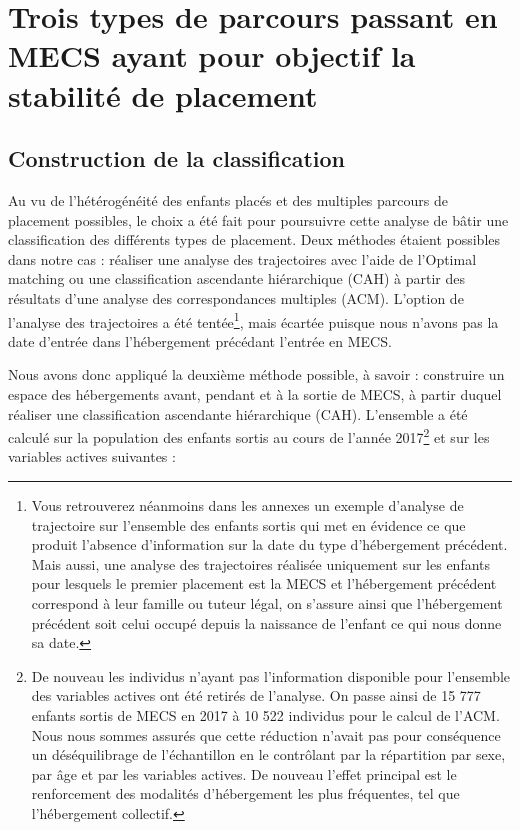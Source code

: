 \documentclass[
  12,
  a4paper,
]{report}
\begin{document}
\hypertarget{trois-types-de-parcours-passant-en-mecs-ayant-pour-objectif-la-stabilituxe9-de-placement}{%
\section{Trois types de parcours passant en MECS ayant pour objectif la
stabilité de
placement}\label{trois-types-de-parcours-passant-en-mecs-ayant-pour-objectif-la-stabilituxe9-de-placement}}

\hypertarget{construction-de-la-classification}{%
\subsection{Construction de la
classification}\label{construction-de-la-classification}}

Au vu de l'hétérogénéité des enfants placés et des multiples parcours de
placement possibles, le choix a été fait pour poursuivre cette analyse
de bâtir une classification des différents types de placement. Deux
méthodes étaient possibles dans notre cas : réaliser une analyse des
trajectoires avec l'aide de l'Optimal matching ou une classification
ascendante hiérarchique (CAH) à partir des résultats d'une analyse des
correspondances multiples (ACM). L'option de l'analyse des trajectoires
a été tentée\footnote{Vous retrouverez néanmoins dans les annexes un
  exemple d'analyse de trajectoire sur l'ensemble des enfants sortis qui
  met en évidence ce que produit l'absence d'information sur la date du
  type d'hébergement précédent. Mais aussi, une analyse des trajectoires
  réalisée uniquement sur les enfants pour lesquels le premier placement
  est la MECS et l'hébergement précédent correspond à leur famille ou
  tuteur légal, on s'assure ainsi que l'hébergement précédent soit celui
  occupé depuis la naissance de l'enfant ce qui nous donne sa date.},
mais écartée puisque nous n'avons pas la date d'entrée dans
l'hébergement précédant l'entrée en MECS.

Nous avons donc appliqué la deuxième méthode possible, à savoir :
construire un espace des hébergements avant, pendant et à la sortie de
MECS, à partir duquel réaliser une classification ascendante
hiérarchique (CAH). L'ensemble a été calculé sur la population des
enfants sortis au cours de l'année 2017\footnote{De nouveau les
  individus n'ayant pas l'information disponible pour l'ensemble des
  variables actives ont été retirés de l'analyse. On passe ainsi de 15
  777 enfants sortis de MECS en 2017 à 10 522 individus pour le calcul
  de l'ACM. Nous nous sommes assurés que cette réduction n'avait pas
  pour conséquence un déséquilibrage de l'échantillon en le contrôlant
  par la répartition par sexe, par âge et par les variables actives. De
  nouveau l'effet principal est le renforcement des modalités
  d'hébergement les plus fréquentes, tel que l'hébergement collectif.}
et sur les variables actives suivantes :
\end{document}
